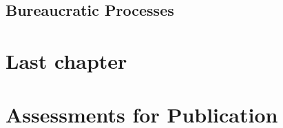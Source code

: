 \documentclass{book}
\begin{document}
%    
%    
  \section{Bureaucratic Processes\label{sec:process}}
    
    
    
    
    
    
    
    
    
    
    
  \clearpage

\clearpage
\chapter{Last chapter}





\appendix

\chapter{Assessments for Publication}
  \clearpage %
  \clearpage  %


\newif\ifbooknotes

\booknotesfalse

\ifbooknotes
\end{document}
